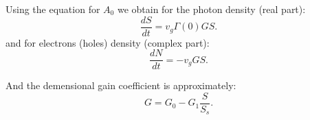 Using the equation for $A_0$ we obtain for the photon density (real part):
\begin{equation}
	\frac{d S}{d t} = v_g \Gamma(0) G S.
\end{equation}
and for electrons (holes) density (complex part):
\begin{equation}
	\frac{d N}{d t} = - v_g G S.
\end{equation}

And the demensional gain coefficient is approximately:
\begin{equation}
	G = G_0 - G_1 \frac{S}{S_s}.
\end{equation}